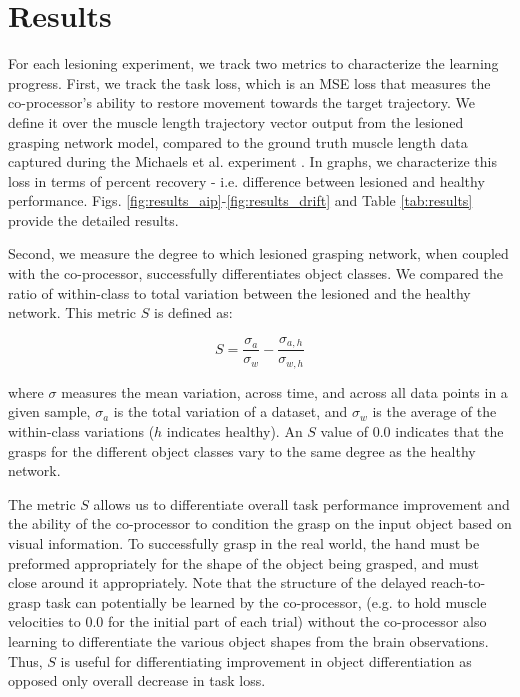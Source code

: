 \documentclass[12pt]{iopart}
\begin{document}
\section{Results}
\label{sec:results}

For each lesioning experiment, we track two metrics to characterize the learning progress. First, we
track the task loss, which is an MSE loss that measures the co-processor's ability to restore
movement towards the target trajectory. We define it over the muscle length trajectory vector
output from the lesioned grasping network model, compared to the ground truth muscle length data captured
during the Michaels et al. experiment \cite{michaels.mrnn}. In graphs, we characterize this loss in terms of 
percent recovery - i.e. difference between lesioned and healthy performance. Figs.
\ref{fig:results_aip}-\ref{fig:results_drift} and Table \ref{tab:results} provide the detailed results.

Second, we measure the degree to which lesioned grasping network, when coupled with the
co-processor, successfully differentiates object classes. We compared the ratio of within-class
to total variation between the lesioned and the healthy network. This metric $S$ is defined as:

\begin{equation}
	S = \frac{\sigma_{a}}{\sigma_{w}} - \frac{\sigma_{a,h}}{\sigma_{w,h}}
\end{equation}

where $\sigma$ measures the mean variation, across time, and across all data points in
a given sample, $\sigma_{a}$ is the total variation of a dataset, and $\sigma_{w}$
is the average of the within-class variations ($h$ indicates healthy). An $S$ value of 0.0 indicates that the
grasps for the different object classes vary to the same degree as the healthy network.

The metric $S$ allows us to differentiate overall task performance improvement
and the ability of the co-processor to condition the grasp on the input object based on visual information.
To successfully grasp in the real world, the hand must be preformed appropriately for
the shape of the object being grasped, and must close around it appropriately.
Note that the structure of the delayed reach-to-grasp task can potentially be learned by the co-processor,
(e.g. to hold muscle velocities to 0.0 for the initial part of each trial) without the co-processor
also learning to differentiate the various object shapes from the brain observations.
Thus, $S$ is useful for differentiating improvement in object differentiation as opposed only overall
decrease in task loss.
\end{document}
